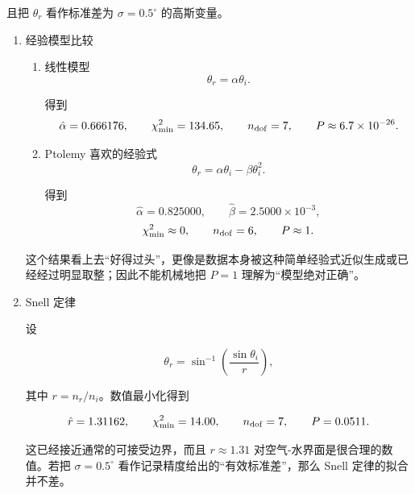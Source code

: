\begin{question}
\begin{solution}
且把 \(\theta_r\) 看作标准差为 \(\sigma=0.5^\circ\) 的高斯变量。

\begin{enumerate}
\item 经验模型比较

\begin{enumerate}
\item
  线性模型 \[
  \theta_r=\alpha\theta_i.
  \]

  得到 \[
  \hat\alpha=0.666176,
  \qquad
  \chi^2_{\min}=134.65,
  \qquad
  n_{\rm dof}=7,
  \qquad
  P\approx6.7\times10^{-26}.
  \]
\item
  Ptolemy 喜欢的经验式 \[
  \theta_r=\alpha\theta_i-\beta\theta_i^2.
  \]

  得到 \[
  \hat\alpha=0.825000,
  \qquad
  \hat\beta=2.5000\times10^{-3},
  \] \[
  \chi^2_{\min}\approx0,
  \qquad
  n_{\rm dof}=6,
  \qquad
  P\approx1.
  \]
\end{enumerate}

这个结果看上去``好得过头''，更像是数据本身被这种简单经验式近似生成或已经经过明显取整；因此不能机械地把
\(P=1\) 理解为``模型绝对正确''。

\item Snell 定律

设

\[
\theta_r=\sin^{-1}\!\left(\frac{\sin\theta_i}{r}\right),
\]

其中 \(r=n_r/n_i\)。数值最小化得到

\[
\hat r=1.31162,
\qquad
\chi^2_{\min}=14.00,
\qquad
n_{\rm dof}=7,
\qquad
P=0.0511.
\]

这已经接近通常的可接受边界，而且 \(r\approx1.31\)
对空气-水界面是很合理的数值。若把 \(\sigma=0.5^\circ\)
看作记录精度给出的``有效标准差''，那么 Snell 定律的拟合并不差。
\end{enumerate}
\end{solution}
\end{question}


